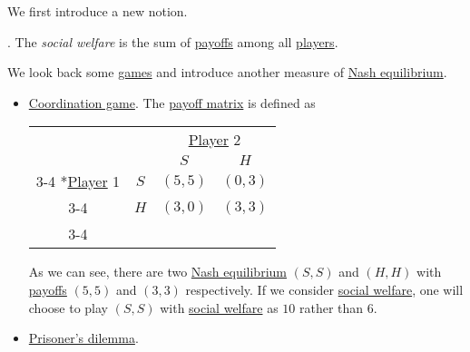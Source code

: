 We first introduce a new notion.
\begin{definition}\label{def:social-welfare}.
	The \emph{social welfare} is the sum of \hyperref[def:reward]{payoffs} among all \hyperref[def:player]{players}.
\end{definition}
\begin{prev}
	We look back some \hyperref[def:game]{games} and introduce another measure of \hyperref[def:Nash-equilibrium]{Nash equilibrium}.
	\begin{itemize}
		\item \hyperref[def:coordination-game]{Coordination game}. The \hyperref[def:payoff-matrix]{payoff matrix} is defined as
		      \begin{table}[H]
			      \centering
			      \setlength{\extrarowheight}{2pt}
			      \begin{tabular}{cc|c|c|}
				                                                     & \multicolumn{1}{c}{} & \multicolumn{2}{c}{\hyperref[def:player]{Player} 2}                           \\
				                                                     & \multicolumn{1}{c}{} & \multicolumn{1}{c}{$S$}                             & \multicolumn{1}{c}{$H$} \\\cline{3-4}
				      \multirow{2}*{\hyperref[def:player]{Player} 1} & $S$                  & $(5, 5)$                                            & $(0, 3)$                \\\cline{3-4}
				                                                     & $H$                  & $(3, 0)$                                            & $(3, 3)$                \\\cline{3-4}
			      \end{tabular}
		      \end{table}
		      As we can see, there are two \hyperref[def:Nash-equilibrium]{Nash equilibrium} \((S, S)\) and \((H, H)\) with \hyperref[def:reward]{payoffs}
		      \((5, 5)\) and \((3, 3)\) respectively. If we consider \hyperref[def:social-welfare]{social welfare}, one will choose to play \((S, S)\) with
		      \hyperref[def:social-welfare]{social welfare} as \(10\) rather than \(6\).
		\item \hyperref[eg:prisoner-dilemma]{Prisoner's dilemma}.
		      \begin{table}[H]
			      \centering
			      \setlength{\extrarowheight}{2pt}
			      \begin{tabular}{cc|c|c|}

\end{tabular}
\end{table}
\end{itemize}
\end{prev}
